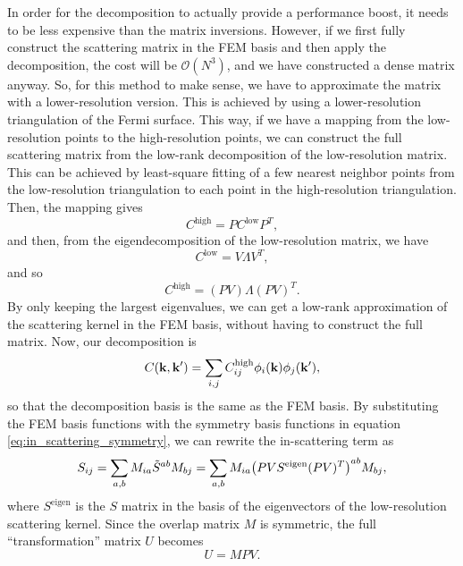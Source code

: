 \documentclass[12pt]{article}
\begin{document}
In order for the decomposition to actually provide a performance boost, it needs to be less
expensive than the matrix inversions. However, if we first fully construct the scattering matrix in
the FEM basis and then apply the decomposition, the cost will be $\mathcal{O}(N^3)$, and we have
constructed a dense matrix anyway. So, for this method to make sense, we have to approximate the
matrix with a lower-resolution version. This is achieved by using a lower-resolution triangulation
of the Fermi surface. This way, if we have a mapping from the low-resolution points to the
high-resolution points, we can construct the full scattering matrix from the low-rank decomposition
of the low-resolution matrix. This can be achieved by least-square fitting of a few nearest neighbor
points from the low-resolution triangulation to each point in the high-resolution triangulation.
Then, the mapping gives
\begin{equation}
    C^{\text{high}} = P C^{\text{low}} P^T,
\end{equation}
and then, from the eigendecomposition of the low-resolution matrix, we have
\begin{equation}
    C^{\text{low}} = V \Lambda V^T,
\end{equation}
and so
\begin{equation}
    C^{\text{high}} = (P V) \Lambda (P V)^T.
\end{equation}
By only keeping the largest eigenvalues, we can get a low-rank approximation of the scattering
kernel in the FEM basis, without having to construct the full matrix. Now, our decomposition is
\begin{equation}
    C(\vb{k}, \vb{k'}) = \sum_{i,j} C^{\text{high}}_{ij} \phi_i(\vb{k})\phi_j(\vb{k'}),
\end{equation}
so that the decomposition basis is the same as the FEM basis. By substituting the FEM basis
functions with the symmetry basis functions in equation \eqref{eq:in_scattering_symmetry}, we
can rewrite the in-scattering term as
\begin{equation}
    S_{ij} = \sum_{a,b} M_{ia} \tilde{S}^{ab} M_{bj} = \sum_{a,b} M_{ia}
    \qty(P V S^{\text{eigen}} (P V)^T)^{ab} M_{bj},
\end{equation}
where $S^{\text{eigen}}$ is the $S$ matrix in the basis of the eigenvectors of the low-resolution
scattering kernel. Since the overlap matrix $M$ is symmetric, the full \enquote{transformation}
matrix $U$ becomes
\begin{equation}
    U = M P V.
\end{equation}
\end{document}
